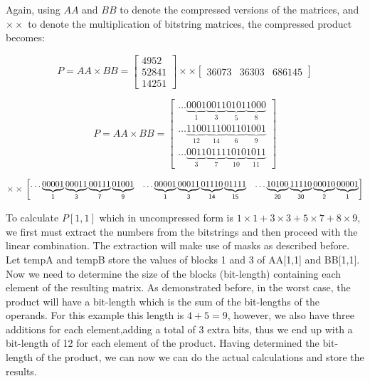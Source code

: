 \documentclass[12pt]{article}
\begin{document}
Again, using $AA$ and $BB$ to denote the compressed versions of the matrices,
and $\times\times$ to denote the multiplication of bitstring matrices, the
compressed product becomes:

\begin{equation}\label{eq:prodbs}
	P = AA \times BB = \begin{bmatrix}
			4952\\ 
			52841\\ 
			14251
		\end{bmatrix} 
        \times\times
        \begin{bmatrix}
			36073 & 36303 & 686145
		\end{bmatrix}
\end{equation}


\begin{equation}
	P = AA \times BB = 
    	\begin{bmatrix}

\ldots\underbrace{0001}_{1}\underbrace{0011}_{3}\underbrace{0101}_{5}\underbrace
{1000}_{8}\\

\ldots\underbrace{1100}_{12}\underbrace{1110}_{14}\underbrace{0110}_{6}
\underbrace{1001}_{9}\\ 

\ldots\underbrace{0011}_{3}\underbrace{0111}_{7}\underbrace{1010}_{10}
\underbrace{1011}_{11}
		\end{bmatrix}
\end{equation}
\begin{small}
\begin{equation}
        \times\times \\
        \begin{bmatrix}\mathsf{
\ldots\underbrace{00001}_{1}\underbrace{00011}_{3}\underbrace{00111}_{7}
\underbrace{01001}_{9}}  &\mathsf{
\ldots\underbrace{00001}_{1}\underbrace{00011}_{3}\underbrace{01110}_{14}
\underbrace{01111}_{15}} & \mathsf{
\ldots\underbrace{10100}_{20}\underbrace{11110}_{30}\underbrace{00010}_{2}
\underbrace{00001}_{1}}
        \end{bmatrix}\nonumber
\end{equation}
\end{small}
To calculate $P[1,1]$ which in uncompressed form is $1 \times 1 + 3 \times 3 + 5
\times 7 + 8 \times 9$, we first must extract the numbers from the bitstrings
and then proceed with the linear combination. The extraction will make use of
masks as described before. Let tempA and tempB store the values of blocks 1 and
3 of AA[1,1] and BB[1,1]. Now we need to determine the size of the blocks
(bit-length) containing each element of the resulting matrix. As demonstrated
before, in the worst case, the product will have a bit-length which is the sum
of the bit-lengths of the operands. For this example this length is $4+5=9$,
however, we also have three additions for each element,adding a total of 3
extra bits, thus we end up with a bit-length of 12 for each element of the
product. Having determined the bit-length of the product, we can now we can do
the actual calculations and store the results.
\end{document}
